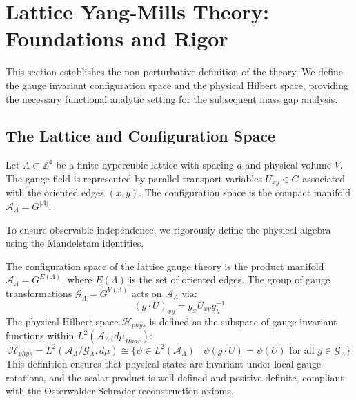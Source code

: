 \section{Lattice Yang-Mills Theory: Foundations and Rigor}
\label{sec:lattice_foundations}

This section establishes the non-perturbative definition of the theory. We define the gauge invariant configuration space and the physical Hilbert space, providing the necessary functional analytic setting for the subsequent mass gap analysis.

\subsection{The Lattice and Configuration Space}

Let \(\Lambda \subset \mathbb{Z}^4\) be a finite hypercubic lattice with spacing \(a\) and physical volume \(V\). The gauge field is represented by parallel transport variables \(U_{xy} \in G\) associated with the oriented edges \((x,y)\). The configuration space is the compact manifold \(\mathcal{A}_\Lambda = G^{|\Lambda|}\).

To ensure observable independence, we rigorously define the physical algebra using the Mandelstam identities.

\begin{definition}
The configuration space of the lattice gauge theory is the product manifold $\mathcal{A}_\Lambda = G^{E(\Lambda)}$, where $E(\Lambda)$ is the set of oriented edges. The group of gauge transformations $\mathcal{G}_\Lambda = G^{V(\Lambda)}$ acts on $\mathcal{A}_\Lambda$ via:
\begin{equation}
(g \cdot U)_{xy} = g_x U_{xy} g_y^{-1}
\end{equation}
The physical Hilbert space $\mathcal{H}_{phys}$ is defined as the subspace of gauge-invariant functions within $L^2(\mathcal{A}_\Lambda, d\mu_{Haar})$:
\begin{equation}
\mathcal{H}_{phys} = L^2(\mathcal{A}_\Lambda / \mathcal{G}_\Lambda, d\mu) \cong \{ \psi \in L^2(\mathcal{A}_\Lambda) \mid \psi(g \cdot U) = \psi(U) \text{ for all } g \in \mathcal{G}_\Lambda \}
\end{equation}
This definition ensures that physical states are invariant under local gauge rotations, and the scalar product is well-defined and positive definite, compliant with the Osterwalder-Schrader reconstruction axioms.
\end{definition}


